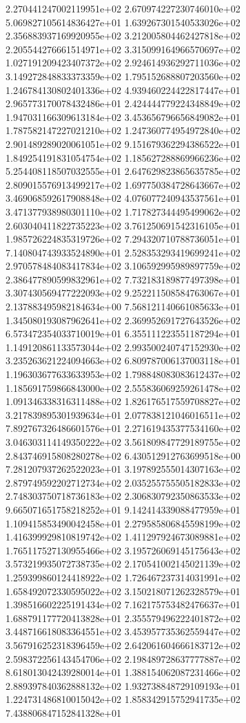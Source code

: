 2.270441247002119951e+02 2.670974227230746010e+02 5.069827105614836427e+01
1.639267301540533026e+02 2.356883937169920955e+02 3.212005804462427818e+02
2.205544276661514971e+02 3.315099164966570697e+02 1.027191209423407372e+02
2.924614936292711036e+02 3.149272848833373359e+02 1.795152688807203560e+02
1.246784130802401336e+02 4.939460224422817447e+01 2.965773170078432486e+01
2.424444779224348849e+02 1.947031166309613184e+02 3.453656796656849082e+01
1.787582147227021210e+02 1.247360774954972840e+02 2.901489289020061051e+02
9.151679362294386522e+01 1.849254191831054754e+02 1.185627288869966236e+02
5.254408118507032555e+01 2.647629823865635785e+02 2.809015576913499217e+02
1.697750384728643667e+02 3.469068592617908848e+02 4.076077240943537561e+01
3.471377938980301110e+02 1.717827344495499062e+02 2.603040411822735223e+02
3.761250691542316105e+01 1.985726224835319726e+02 7.294320710788736051e+01
7.140804743933524890e+01 2.528353293419699241e+02 2.970578484083417834e+02
3.106592995989897759e+02 2.386477890599832961e+02 7.732183189877497398e+01
3.307430569477222093e+02 9.252211508584763067e+01 2.137883495982184634e+00
7.568121140661085633e+01 1.345080193087962641e+02 2.369952691727643526e+02
6.573472354033710019e+01 6.355111223551187294e+01 1.149120861133573044e+02
2.993500240747152930e+02 3.235263621224094663e+02 6.809787006137003118e+01
1.196303677633633953e+02 1.798848083083612437e+02 1.185691759866843000e+02
2.555836069259261478e+02 1.091346338316311488e+02 1.826176517559708827e+02
3.217839895301939634e+01 2.077838121046016511e+02 7.892767326486601576e+01
2.271619435377534160e+02 3.046303114149350222e+02 3.561809847729189755e+02
2.843746915808280278e+02 6.430512912763699518e+00 7.281207937262522023e+01
3.197892555014307163e+02 2.879749592202712734e+02 2.035255755505182833e+02
2.748303750718736183e+02 2.306830792350863533e+02 9.665071651758218252e+01
9.142414339088477959e+01 1.109415853490042458e+01 2.279585806845598199e+02
1.416399929810819742e+02 1.411297924673089881e+02 1.765117527130955466e+02
3.195726069145175643e+02 3.573219935072738735e+02 2.170541002145021139e+02
1.259399860124418922e+02 1.726467237314031991e+02 1.658492072330595022e+02
3.150218071262328579e+01 1.398516602225191434e+02 7.162175753482476637e+01
1.688791177720413828e+01 2.355579496222401872e+02 3.448716618083364551e+02
3.453957735362559447e+02 3.567916252318396459e+02 2.642061604666183712e+02
2.598372256143454706e+02 2.198489728637777887e+02 8.618013042439280014e+01
1.388154062087231466e+02 2.889397840362888132e+02 1.932738848729109193e+01
1.224731486810015042e+02 1.858342915752941735e+02 7.438806847152841328e+01
